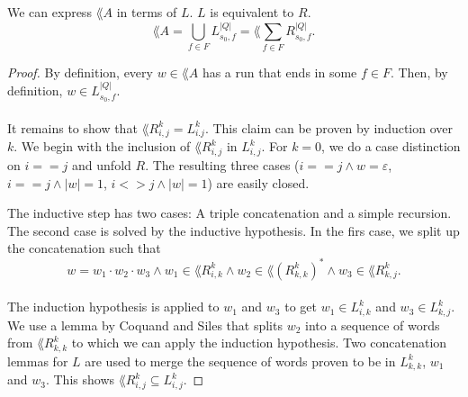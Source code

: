 \documentclass[11pt,a4paper,oneside]{book}
\begin{document}
                    \begin{theorem} We can express $\lang{A}$ in terms of $L$. $L$ is equivalent to $R$.
                        \label{LR}
                        \[
                             \lang{A} = \bigcup\limits_{f \in F} L^{|Q|}_{s_0, f} = \lang{\sum\limits_{f \in F} R^{|Q|}_{s_0, f}}.
                        \]
                    \end{theorem}

                    \begin{proof}
                        By definition, every $w \in \lang{A}$ has a run that ends in some $f \in F$. 
                        Then, by definition, $w \in  L^{|Q|}_{s_0, f}$. 

                    \paragraph{}
                        It remains to show that $\lang{R^k_{i,j}} = L^k_{i.j}$. 
                        This claim can be proven by induction over $k$. 
                        We begin with the inclusion of $\lang{R^k_{i,j}}$ in $L^k_{i,j}$. 
                        For $k=0$, we do a case distinction on $i==j$ and unfold $R$. 
                        The resulting three cases ($i==j \wedge w=\varepsilon$, $i==j \wedge |w|=1$, $i<>j \wedge |w|=1$) are easily closed. 

                        The inductive step has two cases: A triple concatenation and a simple recursion. 
                        The second case is solved by the inductive hypothesis.
                        In the firs case, we split up the concatenation such that
                        \[
                            w = w_1 \cdot w_2 \cdot w_3 
                            \wedge w_1 \in \lang{R^k_{i,k}} 
                            \wedge w_2 \in \lang{(R^k_{k,k})^*} 
                            \wedge w_3 \in \lang{R^k_{k,j}}.
                        \]
                    \paragraph{}
                        The induction hypothesis is applied to $w_1$ and $w_3$ to get $w_1 \in L^k_{i,k}$ and $w_3 \in L^k_{k,j}$.
                        We use a lemma by Coquand and Siles that splits $w_2$ into a sequence of words from $\lang{R^k_{k,k}}$ to which we can apply the induction hypothesis. 
                        Two concatenation lemmas for $L$ are used to merge the sequence of words proven to be in $L^k_{k,k}$,
                        $w_1$ and $w_3$. This shows $\lang{R^k_{i,j}} \subseteq L^k_{i,j}$.


\end{proof}
\end{document}
